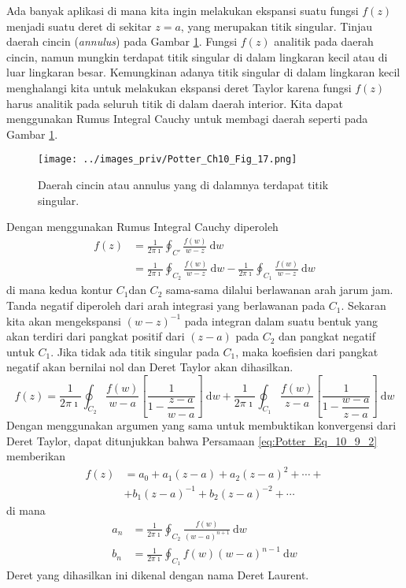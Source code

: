 Ada banyak aplikasi di mana kita ingin melakukan ekspansi suatu fungsi
$f(z)$ menjadi suatu deret di sekitar $z=a$, yang merupakan titik
singular. Tinjau daerah cincin (\textit{annulus}) pada Gambar \ref{fig:Potter_Ch10_Fig17}.
Fungsi $f(z)$
analitik pada daerah cincin, namun mungkin terdapat titik singular
di dalam lingkaran kecil atau di luar lingkaran besar. Kemungkinan
adanya titik singular di dalam lingkaran kecil menghalangi kita untuk
melakukan ekspansi deret Taylor karena fungsi $f(z)$ harus analitik
pada seluruh titik di dalam daerah interior. Kita dapat menggunakan
Rumus Integral Cauchy untuk membagi daerah seperti pada Gambar \ref{fig:Potter_Ch10_Fig17}.

\begin{figure}[h]
{\centering
\texttt{[image: ../images\_priv/Potter\_Ch10\_Fig\_17.png]}
\par}
\caption{Daerah cincin atau annulus yang di dalamnya terdapat titik singular.}
\label{fig:Potter_Ch10_Fig17}
\end{figure}

Dengan menggunakan Rumus Integral Cauchy diperoleh
\begin{align*}
f(z) & =\frac{1}{2\pi\imath}\oint_{C'}\frac{f(w)}{w-z}\ \mathrm{d}w\\
 & =\frac{1}{2\pi\imath}\oint_{C_{2}}\frac{f(w)}{w-z}\ \mathrm{d}w-\frac{1}{2\pi\imath}\oint_{C_{1}}\frac{f(w)}{w-z}\ \mathrm{d}w
\end{align*}
di mana kedua kontur $C_{1}$dan $C_{2}$ sama-sama dilalui berlawanan
arah jarum jam. Tanda negatif diperoleh dari arah integrasi yang berlawanan
pada $C_{1}$. Sekaran kita akan mengekspansi $(w-z)^{-1}$ pada integran
dalam suatu bentuk yang akan terdiri dari pangkat positif dari $(z-a)$
pada $C_{2}$ dan pangkat negatif untuk $C_{1}$. Jika tidak ada titik
singular pada $C_{1}$, maka koefisien dari pangkat negatif akan bernilai
nol dan Deret Taylor akan dihasilkan.
\begin{equation}
f(z) = \frac{1}{2\pi\imath} \oint_{C_{2}}\frac{f(w)}{w-a}\left[\frac{1}{1-\dfrac{z-a}{w-a}}\right]\ \mathrm{d}w +
\frac{1}{2\pi\imath} \oint_{C_{1}} \frac{f(w)}{z-a} \left[\frac{1}{1-\dfrac{w-a}{z-a}}\right]\ \mathrm{d}w
\label{eq:Potter_Eq_10_9_2}
\end{equation}
Dengan menggunakan argumen yang sama untuk membuktikan konvergensi
dari Deret Taylor, dapat ditunjukkan bahwa Persamaan \ref{eq:Potter_Eq_10_9_2} memberikan
\begin{align*}
f(z) & =a_{0}+a_{1}(z-a)+a_{2}(z-a)^{2}+\cdots+\\
 & +b_{1}(z-a)^{-1}+b_{2}(z-a)^{-2}+\cdots
\end{align*}
di mana
\begin{align*}
a_{n} & =\frac{1}{2\pi\imath}\oint_{C_{2}}\frac{f(w)}{(w-a)^{n+1}}\ \mathrm{d}w\\
b_{n} & =\frac{1}{2\pi\imath}\oint_{C_{1}}f(w)(w-a)^{n-1}\ \mathrm{d}w
\end{align*}
Deret yang dihasilkan ini dikenal dengan nama Deret Laurent.

